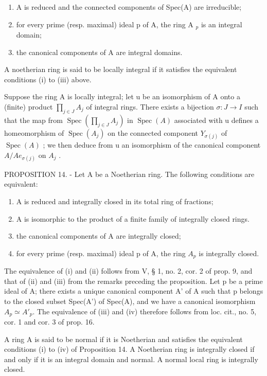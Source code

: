 \begin{enumerate}
\def\labelenumi{(\roman{enumi})}
\item
  A is reduced and the connected components of Spec(A) are irreducible;
\item
  for every prime (resp. maximal) ideal p of A, the ring A \(_{p}\) is an integral domain;
\item
  the canonical components of A are integral domains.
\end{enumerate}

A noetherian ring is said to be locally integral if it satisfies the equivalent conditions (i) to (iii) above.

Suppose the ring A is locally integral; let u be an isomorphism of A onto a (finite) product \(\prod_{j\in J}A_{j}\) of integral rings. There exists a bijection \(\sigma:J\to I\) such that the map from \(\operatorname{Spec}(\prod_{j\in J}A_{j})\) in \(\operatorname{Spec}(A)\) associated with u defines a homeomorphism of \(\operatorname{Spec}(A_{j})\) on the connected component \(Y_{\sigma(j)}\) of \(\operatorname{Spec}(A)\) ; we then deduce from u an isomorphism of the canonical component \(A/Ae_{\sigma(j)}\) on \(A_{j}\) .

PROPOSITION 14. - Let A be a Noetherian ring. The following conditions are equivalent:

\begin{enumerate}
\def\labelenumi{(\roman{enumi})}
\item
  A is reduced and integrally closed in its total ring of fractions;
\item
  A is isomorphic to the product of a finite family of integrally closed rings.
\item
  the canonical components of A are integrally closed;
\item
  for every prime (resp. maximal) ideal p of A, the ring \(A_{p}\) is integrally closed.
\end{enumerate}

The equivalence of (i) and (ii) follows from V, § 1, no. 2, cor. 2 of prop. 9, and that of (ii) and (iii) from the remarks preceding the proposition. Let p be a prime ideal of A; there exists a unique canonical component A' of A such that p belongs to the closed subset Spec(A') of Spec(A), and we have a canonical isomorphism \(A_{p} \simeq A'_{p}\). The equivalence of (iii) and (iv) therefore follows from loc. cit., no. 5, cor. 1 and cor. 3 of prop. 16.

A ring A is said to be normal if it is Noetherian and satisfies the equivalent conditions (i) to (iv) of Proposition 14. A Noetherian ring is integrally closed if and only if it is an integral domain and normal. A normal local ring is integrally closed.

